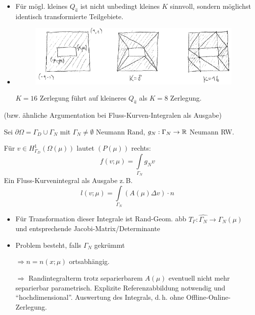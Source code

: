 \begin{bem}
\begin{itemize}
		\item Für mögl. kleines $Q_{\hat{a}}$ ist nicht unbedingt kleines $K$ sinnvoll, sondern möglichst identisch transformierte Teilgebiete.
		\item
			\begin{figure}[H]
				\centering\small
				\includegraphics[width = 0.75 \textwidth]{Bilder/affine-trafo-komponenten.png}
			\end{figure}
			$K=16$ Zerlegung führt auf kleineres $Q_{\hat{a}}$ als $K=8$ Zerlegung.
	\end{itemize}
\end{bem}

\begin{bem}
(bzw. ähnliche Argumentation bei Fluss-Kurven-Integralen als Ausgabe)

Sei $\partial \Omega = \Gamma_D \cup \Gamma_N$ mit $\Gamma_N \neq \emptyset$ Neumann Rand, $g_N: \Gamma_N \rightarrow \mathbb{R}$ Neumann RW.

Für $v \in H_{\Gamma_D}^1 (\Omega(\mu))$ lautet $(P(\mu))$ rechts:
\[
	f(v;\mu) = \int\limits_{\Gamma_N} g_N v
\]
Ein Fluss-Kurvenintegral als Ausgabe z.\,B.
\[
	l(v;\mu) = \int\limits_{\Gamma_N} (A(\mu) \Delta v)\cdot n
\]
\begin{itemize}
	\item Für  Transformation dieser Integrale ist Rand-Geom. abb $T_{\Gamma} : \hat{\Gamma_N} \rightarrow \Gamma_N (\mu)$ und entsprechende Jacobi-Matrix/Determinante
	\item Problem besteht, falls $\Gamma_N$ gekrümmt
		
		$\Rightarrow n=n(x;\mu)$ ortsabhängig.
		
		$\Rightarrow$ Randintegralterm trotz separierbarem $A(\mu)$ eventuell nicht mehr separierbar parametrisch. Explizite Referenzabbildung notwendig und ``hochdimensional''. Auswertung des Integrals, d.\,h. ohne Offline-Online-Zerlegung.
\end{itemize}
\end{bem}

